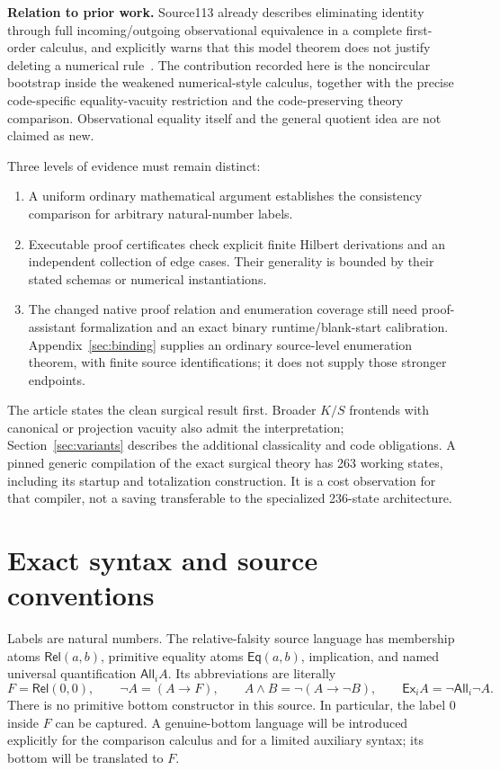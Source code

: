 \documentclass[11pt,letterpaper]{article}
\theoremstyle{definition}\newtheorem{definition}[theorem]{Definition}
\theoremstyle{remark}\newtheorem{remark}[theorem]{Remark}
\newcommand{\Rel}{\mathsf{Rel}}
\newcommand{\Eq}{\mathsf{Eq}}
\newcommand{\All}{\mathsf{All}}
\newcommand{\Ex}{\mathsf{Ex}}
\newcommand{\To}{\rightarrow}
\begin{document}
\textbf{Relation to prior work.} Source113 already describes eliminating identity through full incoming/outgoing observational equivalence in a complete first-order calculus, and explicitly warns that this model theorem does not justify deleting a numerical rule~\cite{source113}. The contribution recorded here is the noncircular bootstrap inside the weakened numerical-style calculus, together with the precise code-specific equality-vacuity restriction and the code-preserving theory comparison. Observational equality itself and the general quotient idea are not claimed as new.

Three levels of evidence must remain distinct:
\begin{enumerate}
\item A uniform ordinary mathematical argument establishes the consistency comparison for arbitrary natural-number labels.
\item Executable proof certificates check explicit finite Hilbert derivations and an independent collection of edge cases. Their generality is bounded by their stated schemas or numerical instantiations.
\item The changed native proof relation and enumeration coverage still need proof-assistant formalization and an exact binary runtime/blank-start calibration. Appendix~\ref{sec:binding} supplies an ordinary source-level enumeration theorem, with finite source identifications; it does not supply those stronger endpoints.
\end{enumerate}
The article states the clean surgical result first. Broader $K/S$ frontends with canonical or projection vacuity also admit the interpretation; Section~\ref{sec:variants} describes the additional classicality and code obligations. A pinned generic compilation of the exact surgical theory has 263 working states, including its startup and totalization construction. It is a cost observation for that compiler, not a saving transferable to the specialized 236-state architecture.

\section{Exact syntax and source conventions}\label{sec:syntax}
Labels are natural numbers. The relative-falsity source language has membership atoms $\Rel(a,b)$, primitive equality atoms $\Eq(a,b)$, implication, and named universal quantification $\All_i A$. Its abbreviations are literally
\begin{equation}\label{eq:abbr}
 F=\Rel(0,0),\qquad \neg A=(A\To F),\qquad
 A\wedge B=\neg(A\To\neg B),\qquad
 \Ex_i A=\neg\All_i\neg A.
\end{equation}
There is no primitive bottom constructor in this source. In particular, the label 0 inside $F$ can be captured. A genuine-bottom language will be introduced explicitly for the comparison calculus and for a limited auxiliary syntax; its bottom will be translated to $F$.
\end{document}
